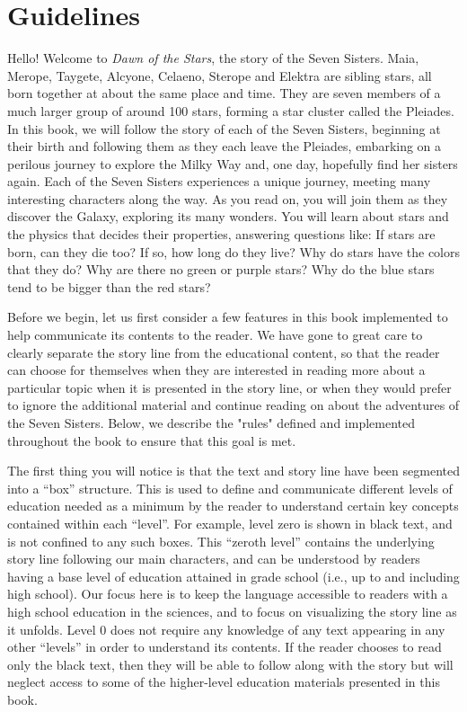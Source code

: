 \documentclass[main.tex]{subfiles}
\begin{document}
\newpage
{}
\section*{Guidelines} \label{guide}

\par \nar Hello!  Welcome to {\it Dawn of the Stars}, the story of the Seven Sisters.  Maia, Merope, Taygete, Alcyone, Celaeno, Sterope and Elektra are sibling stars, all born together at about the same place and time.  They are seven members of a much larger group of around 100 stars, forming a star cluster called the Pleiades.  In this book, we will follow the story of each of the Seven Sisters, beginning at their birth and following them as they each leave the Pleiades, embarking on a perilous journey to explore the Milky Way and, one day, hopefully find her sisters again.  Each of the Seven Sisters experiences a unique journey, meeting many interesting characters along the way.  As you read on, you will join them as they discover the Galaxy, exploring its many wonders.  You will learn about stars and the physics that decides their properties, answering questions like:  If stars are born, can they die too?  If so, how long do they live?  Why do stars have the colors that they do?  Why are there no green or purple stars?  Why do the blue stars tend to be bigger than the red stars?  

\par \nar Before we begin, let us first consider a few features in this book implemented to help communicate its contents to the reader.  We have gone to great care to clearly separate the story line from the educational content, so that the reader can choose for themselves when they are interested in reading more about a particular topic when it is presented in the story line, or when they would prefer to ignore the additional material and continue reading on about the adventures of the Seven Sisters.  Below, we describe the "rules" defined and implemented throughout the book to ensure that this goal is met.

\par \nar The first thing you will notice is that the text and story line have been segmented into a “box” structure.  This is used to define and communicate different levels of education needed as a minimum by the reader to understand certain key concepts contained within each “level”.  For example, level zero is shown in black text, and is not confined to any such boxes.  This “zeroth level” contains the underlying story line following our main characters, and can be understood by readers having a base level of education attained in grade school (i.e., up to and including high school).  Our focus here is to keep the language accessible to readers with a high school education in the sciences, and to focus on visualizing the story line as it unfolds.  Level 0 does not require any knowledge of any text appearing in any other “levels” in order to understand its contents.  If the reader chooses to read only the black text, then they will be able to follow along with the story but will neglect access to some of the higher-level education materials presented in this book.  
\end{document}
